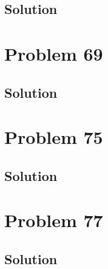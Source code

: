 \documentclass[12pt]{article}
\begin{document}
        \subsection{Solution}

    \pagebreak
    \section{Problem 69}

        \subsection{Solution}

    \pagebreak
    \section{Problem 75}

        \subsection{Solution}

    \pagebreak
    \section{Problem 77}

        \subsection{Solution}

    \pagebreak
    
    \tableofcontents
\end{document}
